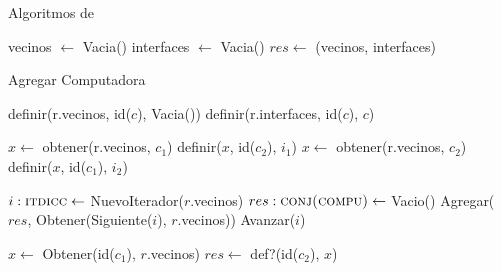\begin{Algoritmos}


\begin{algorithm}
  \caption{Algoritmos de }
\begin{algorithmic}[1]
  \State vecinos $\gets$ Vacia()
  \State interfaces $\gets$ Vacia()
  \State $res \gets$ (vecinos, interfaces)
  \EndProcedure
\end{algorithmic}
\end{algorithm}


\begin{algorithm}
\caption{Agregar Computadora}
\begin{algorithmic}[1]
  \State definir(r.vecinos, id($c$), Vacia())
  \State definir(r.interfaces, id($c$), $c$)
 \EndProcedure
\end{algorithmic}
\end{algorithm}



\begin{algorithm}
\begin{algorithmic}[1]
  \State $x \gets$ obtener(r.vecinos, $c_1$)
  \State definir($x$, id($c_2$), $i_1$)
  \State $x \gets$ obtener(r.vecinos, $c_2$)
  \State definir($x$, id($c_1$), $i_2$)
 \EndProcedure
\end{algorithmic}




\begin{algorithmic}[1]
  \State $i :\textsc{itdicc} \gets$ NuevoIterador($r$.vecinos)
  \State $res :\textsc{conj(compu)} \gets$ Vacio()
    \State Agregar($res$, Obtener(Siguiente($i$), $r$.vecinos))
    \State Avanzar($i$)
  \EndWhile
 \EndProcedure
\end{algorithmic}


\begin{algorithmic}[1]
  \State $x \gets$ Obtener(id($c_1$), $r$.vecinos)
  \State $res \gets$ def?(id($c_2$), $x$)
 \EndProcedure
\end{algorithmic}



\end{algorithm}
\end{Algoritmos}
